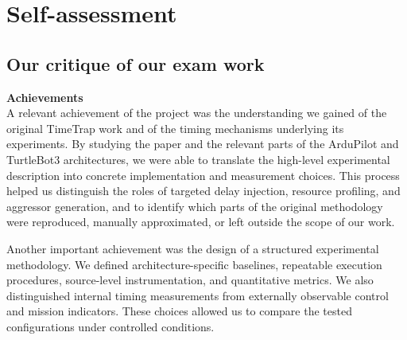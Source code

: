 \section{Self-assessment}

\subsection{Our critique of our exam work}

\noindent \textbf{Achievements} \\ 
\noindent A relevant achievement of the project was the understanding we gained of the original TimeTrap work and of the timing mechanisms underlying its experiments. By studying the paper and the relevant parts of the ArduPilot and TurtleBot3 architectures, we were able to translate the high-level experimental description into concrete implementation and measurement choices. This process helped us distinguish the roles of targeted delay injection, resource profiling, and aggressor generation, and to identify which parts of the original methodology were reproduced, manually approximated, or left outside the scope of our work.

\noindent Another important achievement was the design of a structured experimental methodology. We defined architecture-specific baselines, repeatable execution procedures, source-level instrumentation, and quantitative metrics. We also distinguished internal timing measurements from externally observable control and mission indicators. These choices allowed us to compare the tested configurations under controlled conditions.

